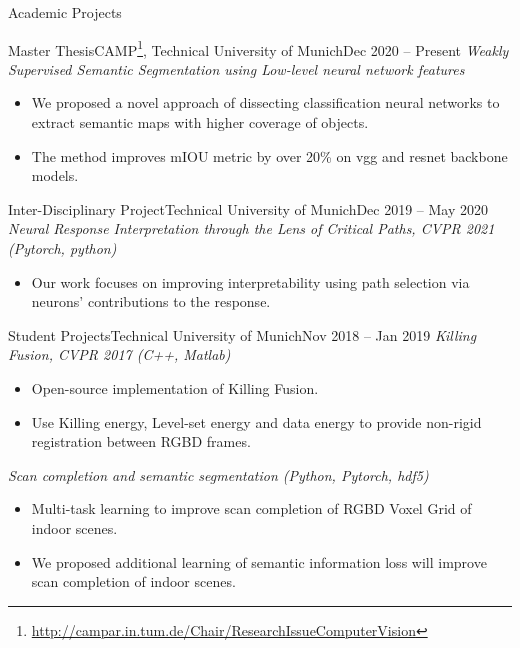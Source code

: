 \documentclass[]{mcdowellcv}
\begin{document}
    \makeheader
    
    \begin{cvsection}{Academic Projects}
    \begin{cvsubsection}[2]{Master Thesis}{CAMP\footnote{\href{http://campar.in.tum.de/Chair/ResearchIssueComputerVision}{http://campar.in.tum.de/Chair/ResearchIssueComputerVision}}, Technical University of Munich}{Dec 2020 -- Present}
    \textit{Weakly Supervised Semantic Segmentation using Low-level neural network features}
        \begin{itemize}
            \item We proposed a novel approach of dissecting classification neural networks to extract semantic maps with higher coverage of objects.
            \item The method improves mIOU metric by over 20\% on vgg and resnet backbone models.
        \end{itemize}
    \end{cvsubsection}
    
    \begin{cvsubsection}{Inter-Disciplinary Project}{Technical University of Munich}{Dec 2019 -- May 2020}
    \textit{Neural Response Interpretation through the Lens of Critical Paths, CVPR 2021 (Pytorch, python) \cite{khakzar-2021}}
        \begin{itemize}
        \item Our work focuses on improving interpretability using path selection via
neurons’ contributions to the response.
        \end{itemize}
    \end{cvsubsection}
    
    \begin{cvsubsection}{Student Projects}{Technical University of Munich}{Nov 2018 -- Jan 2019}
    \textit{Killing Fusion, CVPR 2017 (C++, Matlab) \cite{slavcheva2017killingfusion}}
        \begin{itemize}
        \item Open-source implementation of Killing Fusion.
        \item Use Killing energy, Level-set energy and data energy to provide non-rigid registration between RGBD frames.
        \end{itemize}
    \textit{Scan completion and semantic segmentation (Python, Pytorch, hdf5)}
        \begin{itemize}
        \item Multi-task learning to improve scan completion of RGBD Voxel Grid of indoor scenes.
        \item We proposed additional learning of semantic information loss will improve scan completion of indoor scenes.
        \end{itemize}
    \end{cvsubsection}
    
    \end{cvsection}
    
\end{document}
